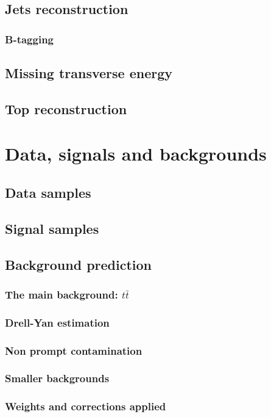 \documentclass[a4paper, 10pt, openright]{report}
\begin{document}
\section{Jets reconstruction} \label{section:RecoJet}
\subsection{B-tagging} 
\section{Missing transverse energy} \label{section:RecoMET}
\section{Top reconstruction} \label{section:RecoTop}

\chapter{Data, signals and backgrounds} \label{chapter:Samples}
\section{Data samples}
\section{Signal samples}
\section{Background prediction}
\subsection{The main background: $t \bar t$}
\subsection{Drell-Yan estimation}
\subsection{Non prompt contamination} \label{subsection:Fakes}
\subsection{Smaller backgrounds}
\subsection{Weights and corrections applied}
\end{document}
